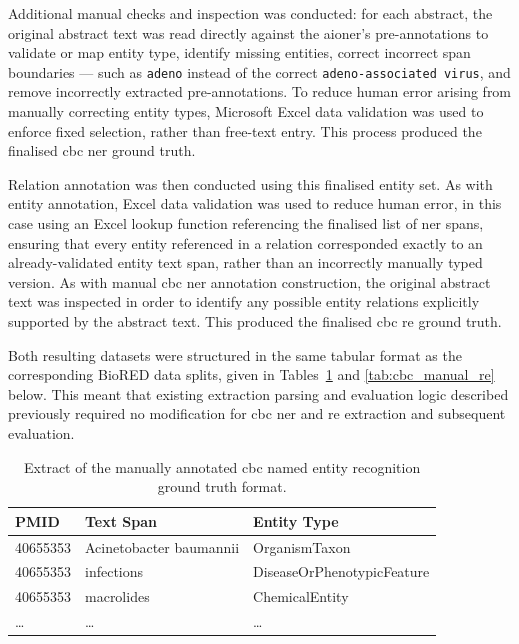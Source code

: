 Additional manual checks and inspection was conducted: for each abstract, the original abstract text was read directly against the \gls{aioner}'s pre-annotations to validate or map entity type, identify missing entities, correct incorrect span boundaries --- such as \texttt{adeno} instead of the correct \texttt{adeno-associated virus}, and remove incorrectly extracted pre-annotations. To reduce human error arising from manually correcting entity types, Microsoft Excel data validation was used to enforce fixed selection, rather than free-text entry. This process produced the finalised \gls{cbc} \gls{ner} ground truth.

Relation annotation was then conducted using this finalised entity set. As with entity annotation, Excel data validation was used to reduce human error, in this case using an Excel lookup function referencing the finalised list of \gls{ner} spans, ensuring that every entity referenced in a relation corresponded exactly to an already-validated entity text span, rather than an incorrectly manually typed version. As with manual \gls{cbc} \gls{ner} annotation construction, the original abstract text was inspected in order to identify any possible entity relations explicitly supported by the abstract text. This produced the finalised \gls{cbc} \gls{re} ground truth.

Both resulting datasets were structured in the same tabular format as the corresponding BioRED data splits, given in Tables~\ref{tab:cbc_manual_ner} and \ref{tab:cbc_manual_re} below. This meant that existing extraction parsing and evaluation logic described previously required no modification for \gls{cbc} \gls{ner} and \gls{re} extraction and subsequent evaluation.

\begin{table}[H]
    \centering
    \caption{Extract of the manually annotated \gls{cbc} named entity recognition ground truth format.}
    \label{tab:cbc_manual_ner}
    \begin{tabularx}{\textwidth}{l l l}
        \toprule
        PMID & Text Span & Entity Type \\
        \midrule
        40655353 & Acinetobacter baumannii & OrganismTaxon \\
        40655353 & infections & DiseaseOrPhenotypicFeature \\
        40655353 & macrolides & ChemicalEntity \\
        \dots & \dots & \dots \\
        \bottomrule
    \end{tabularx}
\end{table}


